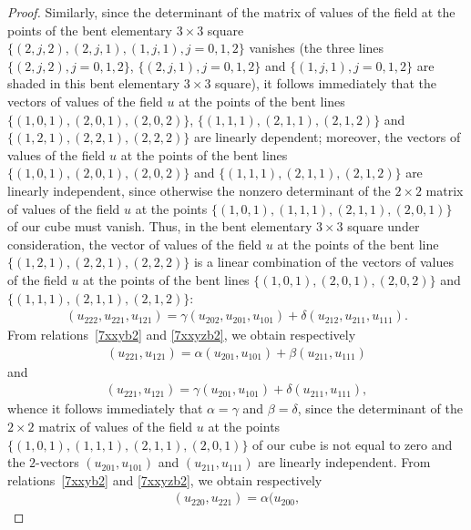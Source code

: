 \documentclass[pdftex]{sigma}
\begin{document}
\begin{proof}
Similarly, since the determinant of the matrix of values of the
f\/ield at the points of the bent elementary $3 \times 3$ square
$\{(2, j, 2), (2, j, 1), (1, j, 1), j = 0, 1, 2\}$ vanishes (the
three lines $\{(2, j, 2), j = 0, 1, 2\}$, $\{(2, j, 1), j = 0, 1,
2\}$ and $\{(1, j, 1), j = 0, 1, 2\}$ are shaded in this bent
elementary $3 \times 3$ square), it follows immediately that the
vectors of values of the f\/ield $u$ at the points of the bent lines
$\{(1, 0, 1), (2, 0, 1), (2, 0, 2)\}$, $\{(1, 1, 1), (2, 1, 1), (2,
1, 2)\}$ and $\{(1, 2, 1), (2, 2, 1), (2, 2, 2)\}$ are linearly
dependent; moreover, the vectors of values of the f\/ield $u$ at the
points of the bent lines $\{(1, 0, 1), (2, 0, 1), (2, 0, 2)\}$ and
$\{(1, 1, 1), (2, 1, 1), (2, 1, 2)\}$ are linearly independent,
since otherwise the nonzero determinant of the $2 \times 2$ matrix
of values of the f\/ield $u$ at the points $\{(1, 0, 1), (1, 1, 1),
(2, 1, 1), (2, 0, 1)\}$ of our cube must vanish. Thus, in the bent
elementary $3 \times 3$ square under consideration, the vector of
values of the f\/ield $u$ at the points of the bent line $\{(1, 2, 1),
(2, 2, 1), (2, 2, 2)\}$ is a linear combination of the vectors of
values of the f\/ield $u$ at the points of the bent lines $\{(1, 0,
1), (2, 0, 1), (2, 0, 2)\}$ and $\{(1, 1, 1), (2, 1, 1), (2, 1,
2)\}$:  \begin{gather} (u_{2 2 2}, u_{2 2 1}, u_{1 2 1}) = \gamma (u_{2 0 2},
u_{2 0 1}, u_{1 0 1}) + \delta (u_{2 1 2}, u_{2 1 1}, u_{1 1 1}).
\label{7xxyzb2} \end{gather} From relations~\eqref{7xxyb2} and
\eqref{7xxyzb2}, we obtain respectively
\begin{gather*} (u_{2 2 1}, u_{1 2 1}) =
\alpha (u_{2 0 1}, u_{1 0 1}) + \beta (u_{2 1 1}, u_{1 1 1})
\end{gather*} and
\begin{gather*}
(u_{2 2 1}, u_{1 2 1}) = \gamma (u_{2 0
1}, u_{1 0 1}) + \delta (u_{2 1 1}, u_{1 1 1}),
\end{gather*}
whence it follows immediately that $\alpha = \gamma$ and $\beta =
\delta$, since the determinant of the $2 \times 2$ matrix of values
of the f\/ield $u$ at the points $\{(1, 0, 1), (1, 1, 1), (2, 1, 1),
(2, 0, 1)\}$ of our cube is not equal to zero and the $2$-vectors
$(u_{2 0 1}, u_{1 0 1})$ and $(u_{2 1 1}, u_{1 1 1})$ are linearly
independent. From relations~\eqref{7xxyb2} and \eqref{7xxyzb2}, we
obtain respectively
\begin{gather} (u_{2 2 0}, u_{2 2 1}) = \alpha (u_{2 0 0},

\end{gather}
\end{proof}
\end{document}
